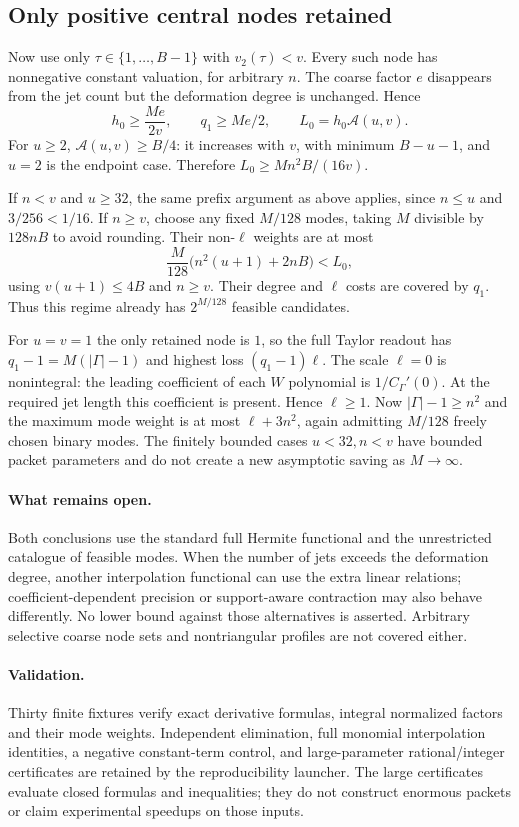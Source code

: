 \documentclass[11pt]{article}
\begin{document}
\subsection{Only positive central nodes retained}
Now use only $\tau\in\{1,\ldots,B-1\}$ with $v_2(\tau)<v$.
Every such node has nonnegative constant valuation, for arbitrary $n$.
The coarse factor $e$ disappears from the jet count but the deformation
degree is unchanged. Hence
\[
 h_0\ge\frac{Me}{2v},\qquad q_1\ge Me/2,
 \qquad L_0=h_0\mathcal A(u,v).
\]
For $u\ge2$, $\mathcal A(u,v)\ge B/4$: it increases with $v$, with
minimum $B-u-1$, and $u=2$ is the endpoint case.
Therefore $L_0\ge Mn^2B/(16v)$.

If $n<v$ and $u\ge32$, the same prefix argument as above applies,
since $n\le u$ and $3/256<1/16$.
If $n\ge v$, choose any fixed $M/128$ modes, taking $M$ divisible
by $128nB$ to avoid rounding. Their non-$\ell$ weights are at most
\[
 \frac M{128}\bigl(n^2(u+1)+2nB\bigr)<L_0,
\]
using $v(u+1)\le4B$ and $n\ge v$. Their degree and $\ell$ costs
are covered by $q_1$. Thus this regime already has $2^{M/128}$
feasible candidates.

For $u=v=1$ the only retained node is $1$, so the full Taylor readout
has $q_1-1=M(|\Gamma|-1)$ and highest loss $(q_1-1)\ell$.
The scale $\ell=0$ is nonintegral: the leading coefficient of each
$W$ polynomial is $1/C_\Gamma'(0)$. At the required jet length this
coefficient is present. Hence $\ell\ge1$. Now
$|\Gamma|-1\ge n^2$ and the maximum mode weight is at most
$\ell+3n^2$, again admitting $M/128$ freely chosen binary modes.
The finitely bounded cases $u<32,n<v$ have bounded packet parameters
and do not create a new asymptotic saving as $M\to\infty$.

\paragraph{What remains open.}
Both conclusions use the standard full Hermite functional and the
unrestricted catalogue of feasible modes. When the number of jets
exceeds the deformation degree, another interpolation functional can
use the extra linear relations; coefficient-dependent precision or
support-aware contraction may also behave differently. No lower bound
against those alternatives is asserted. Arbitrary selective coarse
node sets and nontriangular profiles are not covered either.

\paragraph{Validation.}
Thirty finite fixtures verify exact derivative formulas, integral
normalized factors and their mode weights. Independent elimination,
full monomial interpolation identities, a negative constant-term
control, and large-parameter rational/integer certificates are retained
by the reproducibility launcher. The large certificates evaluate closed
formulas and inequalities; they do not construct enormous packets or
claim experimental speedups on those inputs.
\end{document}
